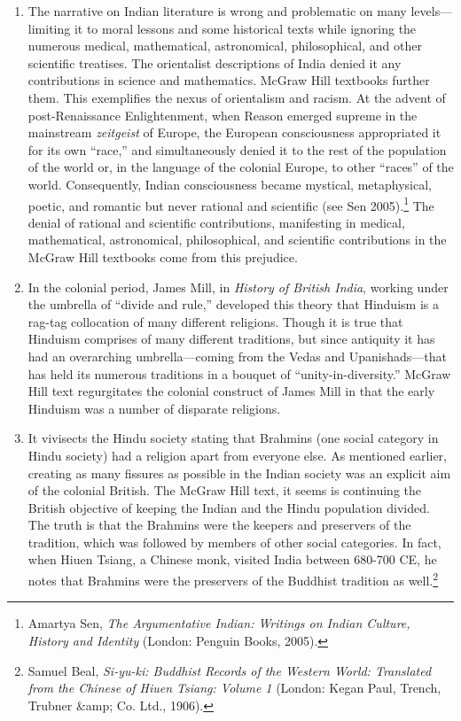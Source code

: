\begin{enumerate}
\item The narrative on Indian literature is wrong and problematic on many levels—limiting it to moral lessons and some historical texts while ignoring the numerous medical, mathematical, astronomical, philosophical, and other scientific treatises. The orientalist descriptions of India denied it any contributions in science and mathematics. McGraw Hill textbooks further them. This exemplifies the nexus of orientalism and racism. At the advent of post-Renaissance Enlightenment, when Reason emerged supreme in the mainstream \textit{zeitgeist} of Europe, the European consciousness appropriated it for its own “race,” and simultaneously denied it to the rest of the population of the world or, in the language of the colonial Europe, to other “races” of the world. Consequently, Indian consciousness became mystical, metaphysical, poetic, and romantic but never rational and scientific (see Sen 2005).\footnote{Amartya Sen, \textit{The Argumentative Indian: Writings on Indian Culture, History and Identity} (London: Penguin Books, 2005).} The denial of rational and scientific contributions, manifesting in medical, mathematical, astronomical, philosophical, and scientific contributions in the McGraw Hill textbooks come from this prejudice. 

\item In the colonial period, James Mill, in \textit{History of British India}, working under the umbrella of “divide and rule,” developed this theory that Hinduism is a rag-tag collocation of many different religions. Though it is true that Hinduism comprises of many different traditions, but since antiquity it has had an overarching umbrella—coming from the Vedas and Upanishads—that has held its numerous traditions in a bouquet of “unity-in-diversity.” McGraw Hill text regurgitates the colonial construct of James Mill in that the early Hinduism was a number of disparate religions.

\item It vivisects the Hindu society stating that Brahmins (one social category in Hindu society) had a religion apart from everyone else. As mentioned earlier, creating as many fissures as possible in the Indian society was an explicit aim of the colonial British. The McGraw Hill text, it seems is continuing the British objective of keeping the Indian and the Hindu population divided. The truth is that the Brahmins were the keepers and preservers of the tradition, which was followed by members of other social categories. In fact, when Hiuen Tsiang, a Chinese monk, visited India between 680-700 CE, he notes that Brahmins were the preservers of the Buddhist tradition as well.\footnote{Samuel Beal, \textit{Si-yu-ki: Buddhist Records of the Western World: Translated from the Chinese of Hiuen Tsiang: Volume 1} (London: Kegan Paul, Trench, Trubner &amp; Co. Ltd., 1906).} 


\end{enumerate}
